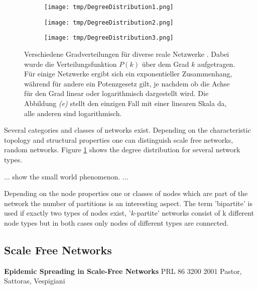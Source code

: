 \documentclass[a4paper,10pt]{scrbook}
\begin{document}
\begin{figure}[H]
\centering
	\begin{minipage}[t]{0.6\textwidth}
		\begin{figure}[H]
		\texttt{[image: tmp/DegreeDistribution1.png]}
		\end{figure}
	\end{minipage}
	\begin{minipage}[t]{0.6\textwidth}
		\begin{figure}[H]
		\texttt{[image: tmp/DegreeDistribution2.png]}
		\end{figure}
	\end{minipage}
	\begin{minipage}[t]{0.6\textwidth}
		\begin{figure}[H]
		\texttt{[image: tmp/DegreeDistribution3.png]}
		\end{figure}
	\end{minipage}
	
	\caption{Verschiedene Gradverteilungen für diverse reale Netzwerke \cite{Newman}. Dabei wurde die Verteilungsfunktion $P(k)$ über dem Grad $k$ aufgetragen. Für einige Netzwerke ergibt sich ein exponentieller Zusammenhang, während für andere ein Potenzgesetz gilt, je nachdem ob die Achse für den Grad linear oder logarithmisch dargestellt wird. Die Abbildung \textit{(e)} stellt den einzigen Fall mit einer linearen Skala da, alle anderen sind logarithmisch.}
	\label{Gradverteilungen}
\end{figure}

Several categories and classes of networks exist. Depending on the characteristic topology and structural properties one can distinguish scale free networks, random networks. Figure \ref{Gradverteilungen} shows the degree distribution for several network types.

... show the small world phenomenon. ...

Depending on the node properties one or classes of nodes which are part of the network the number of partitions is an interesting aspect. The term 'bipartite' is used if exactly two types of nodes exist, '$k$-partite' networks consist of k different node types but in both cases only nodes of different types are connected.   

\subsection{Scale Free Networks}
\textbf{Epidemic Spreading in Scale-Free Networks}
PRL 86 3200 2001 Pastor, Sattoras, Vespigiani
\end{document}
